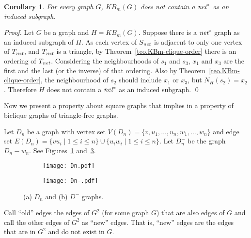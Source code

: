 \documentclass{article}
\newcommand{\net}{\emph{net}}
\newtheorem{corollary}{Corollary}
\begin{document}
\begin{corollary}\label{cor.netstarfree}
  For every graph $G$, $KB_m(G)$ does not contain a $\net^*$ as an induced subgraph.
\end{corollary}
\begin{proof}
  Let $G$ be a graph and $H = KB_m(G)$. Suppose there is a $\net^*$ graph 
  as an induced subgraph of $H$.
  As each vertex of $S_{\net}$ is adjacent to only one vertex of $T_{\net}$, 
  and $T_{\net}$ is a triangle,
  by   Theorem~\ref{teo.KBm-clique-order}  there   is  an   ordering  of
  $T_{\net}$.  Considering the neighbourhoods  of $s_1$ and $s_3$, $x_1$
  and $x_3$ are the first and the last (or the inverse) of that ordering. 
  Also  by Theorem~\ref{teo.KBm-clique-order},  the neighbourhood
  of $s_2$ should include $x_1$ or $x_3$, but $N_H(s_2) = x_2$.
  Therefore $H$ does not contain a $\net^*$ as an induced subgraph.
  \qed
\end{proof}

Now  we present  a  property about  square graphs  that  implies in  a
property of biclique graphs of triangle-free graphs.

Let $D_n$ be a graph with vertex set
$V(D_n) = \{v, u_1, \ldots, u_n, w_1, \ldots, w_n\}$ and edge set
$E(D_n) = \{ vu_i \mid 1 \leq i \leq n\} \cup \{ u_iw_i \mid
1 \leq i \leq n\}$.  Let $D^-_n$ be the graph $D_n - w_n$.
See Figures~\ref{fig:Dn} and~\ref{fig:Dn-}. 

\begin{figure}[htb]
\centering
\begin{subfigure}{.5\textwidth}
  \centering
  \texttt{[image: Dn.pdf]}
  \caption{}
  \label{fig:Dn}
\end{subfigure}%
\begin{subfigure}{.5\textwidth}
  \centering
  \texttt{[image: Dn-.pdf]}
  \caption{}
  \label{fig:Dn-}
\end{subfigure}%
\caption{(a) $D_n$ and (b) $D^-$ graphs.}
\end{figure}

Call ``old'' edges the edges of $G^2$ (for some graph $G$) that are
also edges of $G$ and call the other edges of $G^2$ as ``new'' edges.
That is, ``new'' edges are the edges that are in $G^2$ and do not
exist in  $G$.
\end{document}
